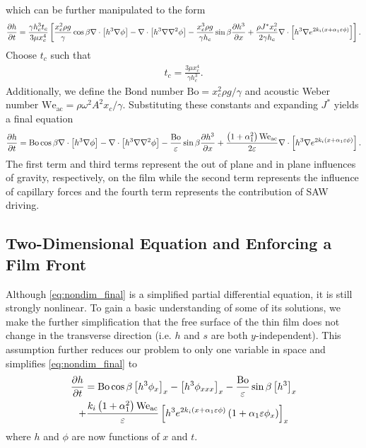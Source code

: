 which can be further manipulated to the form 
\begin{align*}
    \frac{\partial h}{\partial t} = \frac{\gamma h_c^3 t_c}{3\mu x_c^4} \left[ 
        \frac{x_c^2 \rho g}{\gamma} \cos \beta \nabla \cdot \left[ h^3\nabla\phi \right] - 
        \nabla \cdot \left[ h^3 \nabla \nabla^2 \phi \right] - 
        \frac{x_c^3 \rho g}{\gamma h_c} \sin\beta \frac{\partial h^3}{\partial x} + 
        \frac{\rho J^* x_c^2}{2 \gamma h_c} \nabla \cdot \left[ h^3 \nabla e^{2k_i \left( x + \alpha_1 \varepsilon \phi \right)} \right]
     \right].
\end{align*}
Choose $t_c$ such that 
\begin{align*}
    t_c = \frac{3\mu x_c^4}{\gamma h_c^3}.
\end{align*}
Additionally, we define the Bond number $\mathrm{Bo} = x_c^2 \rho g / \gamma$ and acoustic Weber number
$\mathrm{We_{ac}} = \rho \omega^2 A^2 x_c / \gamma$. 
Substituting these constants and expanding $J^*$ yields a final equation
\begin{align}
    \frac{\partial h}{\partial t} = \mathrm{Bo} \cos\beta \nabla \cdot \left[  h^3 \nabla \phi  \right] - 
    \nabla \cdot \left[ h^3 \nabla\nabla^2\phi  \right] - 
    \frac{\mathrm{Bo}}{\varepsilon} \sin\beta \frac{\partial h^3}{\partial x} + 
    \frac{\left( 1 + \alpha_1^2 \right) \mathrm{We_{ac}}}{2\varepsilon} \nabla \cdot \left[ h^3 \nabla e^{2k_i \left( x + \alpha_1 \varepsilon \phi \right)} \right]. 
    \label{eq:nondim_final}
\end{align}   
The first term and third terms represent the out of plane and in plane influences of gravity, respectively, on 
the film while the second term represents the influence of capillary forces and the fourth term represents the 
contribution of SAW driving.  
 
\subsection{Two-Dimensional Equation and Enforcing a Film Front}
Although \cref{eq:nondim_final} is a simplified partial differential equation, 
it is still strongly nonlinear. To gain a basic understanding of some of its solutions,
we make the further simplification that the free surface of the thin film does not change
in the transverse direction (i.e.\! $h$ and $s$ are both $y$-independent). This assumption
further reduces our problem to only one variable in space and simplifies \cref{eq:nondim_final} to 
\begin{multline}
    \frac{\partial h}{\partial t} = \mathrm{Bo}\cos\beta \left[ h^3 \phi_x \right]_x - \left[ h^3 \phi_{xxx} \right]_{x} - \frac{\mathrm{Bo}}{\varepsilon} \sin\beta \left[ h^3 \right]_{x} \\ + 
    \frac{k_i \left( 1 + \alpha_1^2 \right)\mathrm{We_{ac}}}{\varepsilon} \left[ h^3 e^{2k_i \left( x + \alpha_1 \varepsilon \phi \right)} \left( 1 + \alpha_1 \varepsilon \phi_x \right) \right]_x
    \label{eq:two_dim_final}
\end{multline}
where $h$ and $\phi$ are now functions of $x$ and $t$.

